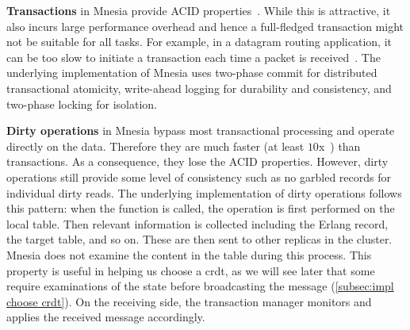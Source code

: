 \textbf{Transactions} in Mnesia provide ACID properties~\cite{ericssonab2023mnesiaguide}.
While this is attractive, it also incurs large performance overhead 
and hence a full-fledged transaction might not be suitable for all tasks.
For example, in a datagram routing application, it can be too slow to initiate
a transaction each time a packet is received~\cite{ericssonab2023mnesiaguide}.
The underlying implementation of Mnesia uses two-phase commit
for distributed transactional atomicity, write-ahead logging for durability and consistency, 
and two-phase locking for isolation.

\textbf{Dirty operations} in Mnesia bypass most transactional processing
and operate directly on the data. Therefore they are much faster 
(at least \(10\)x~\cite{ericssonab2023mnesiaref}) than transactions. As a consequence,
they lose the ACID properties. However, dirty operations still provide 
some level of consistency such as no garbled records for individual dirty reads.
The underlying implementation of dirty operations follows this pattern:
when the function is called, the operation is first performed
on the local table. Then relevant information is collected including
the Erlang record, the target table, and so on. These are then sent 
to other replicas in the cluster.
Mnesia does not examine the content in the table during this process. This 
property is useful in helping us choose a \acrshort{crdt},
as we will see later that some  require examinations of the state
before broadcasting the message (\cref{subsec:impl choose crdt}).
On the receiving side, the transaction manager monitors and
applies the received message accordingly.








